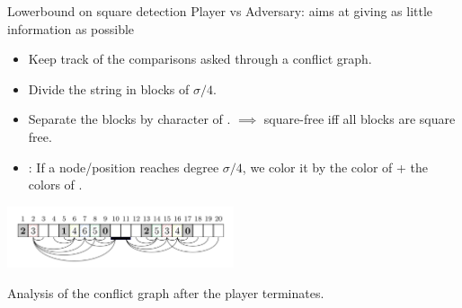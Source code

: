 \begin{frame}{Lowerbound on square detection}
    Player vs Adversary: aims at giving as little information as possible\\
    \begin{itemize}
        \item Keep track of the comparisons asked through a conflict graph.
        \item Divide the string in blocks of $\sigma/4$. 
        \item Separate the blocks by character of . $\implies$ square-free iff all blocks are square free.  
        \item {}: If a node/position reaches degree $\sigma/4$, we color it by  the color of  + the colors of .
    \end{itemize}
    
    \begin{center}
        \includegraphics[width=0.5\textwidth]{pictures/squares_conflict.png}
    \end{center}

    Analysis of the conflict graph after the player terminates.
\end{frame}



